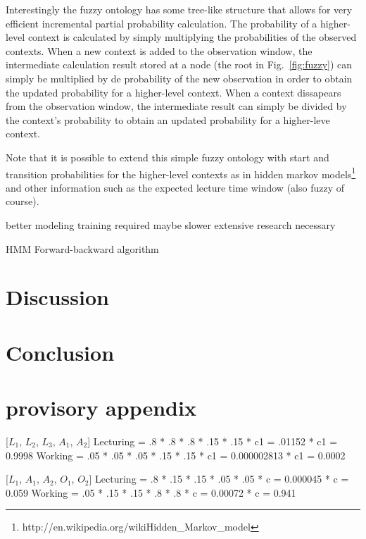 \documentclass[journal]{vgtc}                %
\begin{document}
Interestingly the fuzzy ontology has some tree-like structure that allows for very efficient incremental partial probability calculation. The probability of a higher-level context is calculated by simply multiplying the probabilities of the observed contexts. When a new context is added to the observation window, the intermediate calculation result stored at a node (the root in Fig.~\ref{fig:fuzzy}) can simply be multiplied by de probability of the new observation in order to obtain the updated probability for a higher-level context. When a context dissapears from the observation window, the intermediate result can simply be divided by the context's probability to obtain an updated probability for a higher-leve context. 

Note that it is possible to extend this simple fuzzy ontology with start and transition probabilities for the higher-level contexts as in hidden markov models\footnote{http://en.wikipedia.org/wikiHidden\_Markov\_model} and other information such as the expected lecture time window (also fuzzy of course).


better modeling
training required
maybe slower
extensive research necessary

HMM
Forward-backward algorithm

\section{Discussion}

\section{Conclusion}

\section{provisory appendix}

[$L_1$, $L_2$, $L_3$, $A_1$, $A_2$] 
Lecturing
= .8 * .8 * .8 * .15 * .15 * c1
= .01152 * c1
= 0.9998
Working
= .05 * .05 * .05 * .15 * .15 * c1
= 0.000002813 * c1
= 0.0002

[$L_1$, $A_1$, $A_2$, $O_1$, $O_2$]
Lecturing
= .8 * .15 * .15 * .05 * .05 * c
= 0.000045 * c
= 0.059
Working
= .05 * .15 * .15 * .8 * .8 * c
= 0.00072 * c
= 0.941





\end{document}

